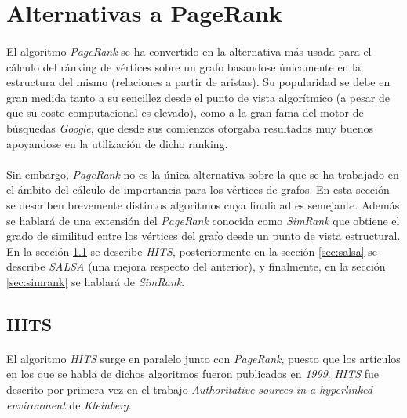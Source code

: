\documentclass{subfiles}
\begin{document}
    \section{Alternativas a PageRank}
    \label{sec:pagerank_alternativas}

      \paragraph{}
      El algoritmo \emph{PageRank} se ha convertido en la alternativa más usada para el cálculo del ránking de vértices sobre un grafo basandose únicamente en la estructura del mismo (relaciones a partir de aristas). Su popularidad se debe en gran medida tanto a su sencillez desde el punto de vista algorítmico (a pesar de que su coste computacional es elevado), como a la gran fama del motor de búsquedas \emph{Google}, que desde sus comienzos otorgaba resultados muy buenos apoyandose en la utilización de dicho ranking.

      \paragraph{}
      Sin embargo, \emph{PageRank} no es la única alternativa sobre la que se ha trabajado en el ámbito del cálculo de importancia para los vértices de grafos. En esta sección se describen brevemente distintos algoritmos cuya finalidad es semejante. Además se hablará de una extensión del \emph{PageRank} conocida como \emph{SimRank} que obtiene el grado de similitud entre los vértices del grafo desde un punto de vista estructural. En la sección \ref{sec:hits} se describe \emph{HITS}, posteriormente en la sección \ref{sec:salsa} se describe \emph{SALSA} (una mejora respecto del anterior), y finalmente, en la sección \ref{sec:simrank} se hablará de \emph{SimRank}.

      \subsection{HITS}
      \label{sec:hits}

        \paragraph{}
        El algoritmo \emph{HITS} surge en paralelo junto con \emph{PageRank}, puesto que los artículos en los que se habla de dichos algoritmos fueron publicados en \emph{1999}. \emph{HITS} fue descrito por primera vez en el trabajo \emph{Authoritative sources in a hyperlinked environment} \cite{kleinberg1999authoritative} de \emph{Kleinberg}.
\end{document}
